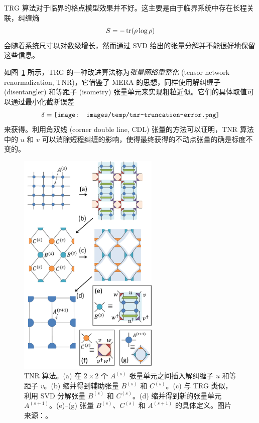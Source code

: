 TRG 算法对于临界的格点模型效果并不好。这主要是由于临界系统中存在长程关联，纠缠熵
\begin{equation}
  S = -\operatorname{tr}(\rho\log\rho)
\end{equation}
会随着系统尺寸以对数级增长，然而通过 SVD 给出的张量分解并不能很好地保留这些信息。

如图~\ref{fig:tnr} 所示，TRG 的一种改进算法称为\emph{张量网络重整化} (tensor network renormalization, TNR)\cite{evenbly2015tensor1,evenbly2017algorithms}，它借鉴了 MERA 的思想，同样使用解纠缠子 (disentangler) 和等距子 (isometry) 张量单元来实现粗粒近似。它们的具体取值可以通过最小化截断误差\cite{evenbly2015tensor1}
\begin{equation}
  \delta = \vcenter{\hbox{\texttt{[image: images/temp/tnr-truncation-error.png]}}}
\end{equation}
来获得。利用角双线 (corner double line, CDL) 张量的方法可以证明\cite{evenbly2015tensor1,hauru2018renormalization}，TNR 算法中的 $u$ 和 $v$ 可以消除短程纠缠的影响，使得最终获得的不动点张量的确是标度不变的。

\begin{figure}[htb]
  \centering
  \includegraphics[width=0.6\textwidth]{images/tensor-network/tnr.pdf}
  \caption[TNR 算法]{TNR 算法。(a) 在 $2\times2$ 个 $A^{(s)}$ 张量单元之间插入解纠缠子 $u$ 和等距子 $v$。(b) 缩并得到辅助张量 $B^{(s)}$ 和 $C^{(s)}$。(c) 与 TRG 类似，利用 SVD 分解张量 $B^{(s)}$ 和 $C^{(s)}$。(d) 缩并得到新的张量单元 $A^{(s+1)}$。(e)--(g) 张量 $B^{(s)}$、$C^{(s)}$ 和 $A^{(s+1)}$ 的具体定义。图片来源：\parencite{evenbly2015tensor1}。}
  \label{fig:tnr}
\end{figure}

